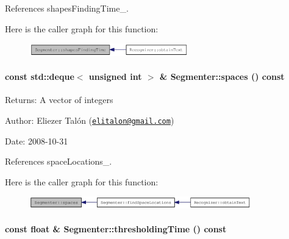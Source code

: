 References shapesFindingTime\_\-.

Here is the caller graph for this function:\nopagebreak
\begin{figure}[H]
\begin{center}
\leavevmode
\includegraphics[width=196pt]{class_segmenter_8d7304b35b1891b1c7154a3ac2ff2c4b_icgraph}
\end{center}
\end{figure}
\hypertarget{class_segmenter_eed49de2d6548ae8016bf6c9c78cec99}{
\paragraph[{spaces}]{\setlength{\rightskip}{0pt plus 5cm}const std::deque$<$ unsigned int $>$ \& Segmenter::spaces () const}\hfill}
\label{class_segmenter_eed49de2d6548ae8016bf6c9c78cec99}


\begin{Desc}
\item[Returns:]A vector of integers\end{Desc}
\begin{Desc}
\item[Author:]Eliezer Talón (\href{mailto:elitalon@gmail.com}{\tt elitalon@gmail.com}) \end{Desc}
\begin{Desc}
\item[Date:]2008-10-31 \end{Desc}


References spaceLocations\_\-.

Here is the caller graph for this function:\nopagebreak
\begin{figure}[H]
\begin{center}
\leavevmode
\includegraphics[width=273pt]{class_segmenter_eed49de2d6548ae8016bf6c9c78cec99_icgraph}
\end{center}
\end{figure}
\hypertarget{class_segmenter_9114d0f3934b43478fb55077b7722d3d}{
\paragraph[{thresholdingTime}]{\setlength{\rightskip}{0pt plus 5cm}const float \& Segmenter::thresholdingTime () const}\hfill}
\label{class_segmenter_9114d0f3934b43478fb55077b7722d3d}


